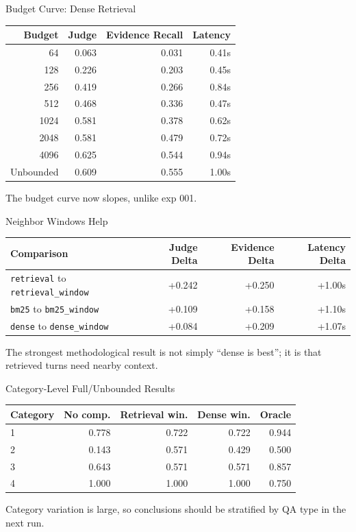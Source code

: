 \documentclass[aspectratio=169]{beamer}
\newcommand{\method}[1]{\texttt{#1}}
\begin{document}
\begin{frame}{Budget Curve: Dense Retrieval}
\begin{tabular}{rrrr}
\toprule
Budget & Judge & Evidence Recall & Latency \\
\midrule
64 & 0.063 & 0.031 & 0.41s \\
128 & 0.226 & 0.203 & 0.45s \\
256 & 0.419 & 0.266 & 0.84s \\
512 & 0.468 & 0.336 & 0.47s \\
1024 & 0.581 & 0.378 & 0.62s \\
2048 & 0.581 & 0.479 & 0.72s \\
4096 & 0.625 & 0.544 & 0.94s \\
Unbounded & 0.609 & 0.555 & 1.00s \\
\bottomrule
\end{tabular}

\vspace{0.5em}
The budget curve now slopes, unlike exp 001.
\end{frame}

\begin{frame}{Neighbor Windows Help}
\begin{tabular}{lrrr}
\toprule
Comparison & Judge Delta & Evidence Delta & Latency Delta \\
\midrule
\method{retrieval} to \method{retrieval\_window} & +0.242 & +0.250 & +1.00s \\
\method{bm25} to \method{bm25\_window} & +0.109 & +0.158 & +1.10s \\
\method{dense} to \method{dense\_window} & +0.084 & +0.209 & +1.07s \\
\bottomrule
\end{tabular}

\vspace{0.5em}
The strongest methodological result is not simply ``dense is best''; it is that retrieved turns need nearby context.
\end{frame}

\begin{frame}{Category-Level Full/Unbounded Results}
\begin{tabular}{lrrrr}
\toprule
Category & No comp. & Retrieval win. & Dense win. & Oracle \\
\midrule
1 & 0.778 & 0.722 & 0.722 & 0.944 \\
2 & 0.143 & 0.571 & 0.429 & 0.500 \\
3 & 0.643 & 0.571 & 0.571 & 0.857 \\
4 & 1.000 & 1.000 & 1.000 & 0.750 \\
\bottomrule
\end{tabular}

\vspace{0.5em}
Category variation is large, so conclusions should be stratified by QA type in the next run.
\end{frame}
\end{document}
